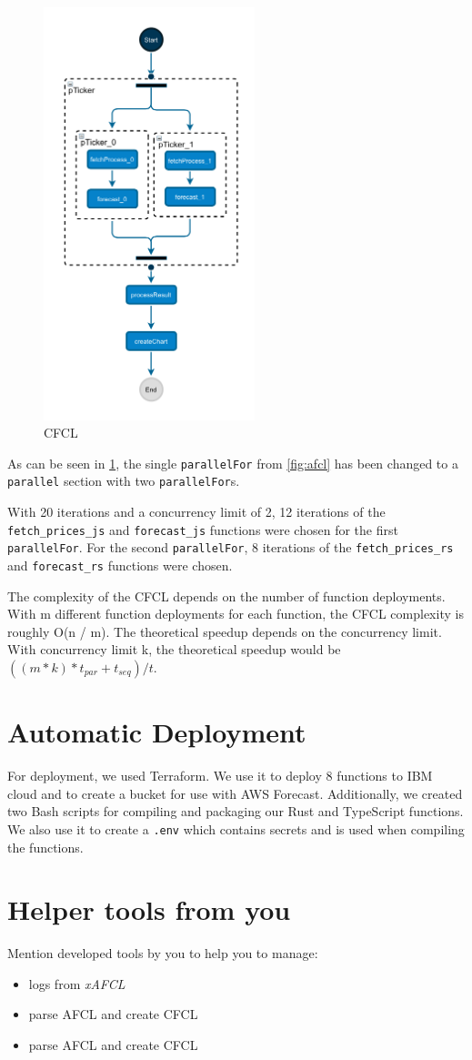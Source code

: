 \begin{figure}[h]
  \centering
  \includegraphics[height=12cm, keepaspectratio]{./assets/cfcl}
  \caption{CFCL}
  \label{fig:cfcl}
\end{figure}

As can be seen in \cref{fig:cfcl}, the single \texttt{parallelFor} from \cref{fig:afcl} has
been changed to a \texttt{parallel} section with two \texttt{parallelFor}s.

With 20 iterations and a concurrency limit of 2, 12 iterations of the \texttt{fetch\_prices\_js} and \texttt{forecast\_js}
functions were chosen for the first \texttt{parallelFor}. For the second \texttt{parallelFor},
8 iterations of the \texttt{fetch\_prices\_rs} and \texttt{forecast\_rs} functions were chosen.

The complexity of the CFCL depends on the number of function deployments. With m different function deployments for each function, the CFCL
complexity is roughly O(n / m). The theoretical speedup depends on the concurrency limit. With concurrency limit k, the theoretical speedup
would be $((m * k) * t_{par} + t_{seq}) / t$.



%
%
%
\section{Automatic Deployment}

For deployment, we used Terraform. We use it to deploy 8 functions to IBM cloud and
to create a bucket for use with AWS Forecast. Additionally, we created two Bash scripts
for compiling and packaging our Rust and TypeScript functions. We also use it to create
a \texttt{.env} which contains secrets and is used when compiling the functions.



%
%
%
\section{Helper tools from you}

Mention developed tools by you to help you to manage:
\begin{itemize}
    \item logs from \textit{xAFCL}
    \item parse AFCL and create CFCL
    \item parse AFCL and create CFCL
\end{itemize}
